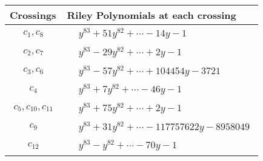 \documentclass[1p]{elsarticle_modified}
\theoremstyle{definition}
\begin{document}
\begin{tabular}{m{50pt}|m{274pt}}
Crossings & \hspace{64pt}Riley Polynomials at each crossing \\
\hline $$\begin{aligned}c_{1},c_{8}\end{aligned}$$&$\begin{aligned}
&y^{83}+51 y^{82}+\cdots-14 y-1
\end{aligned}$\\
\hline $$\begin{aligned}c_{2},c_{7}\end{aligned}$$&$\begin{aligned}
&y^{83}-29 y^{82}+\cdots+2 y-1
\end{aligned}$\\
\hline $$\begin{aligned}c_{3},c_{6}\end{aligned}$$&$\begin{aligned}
&y^{83}-57 y^{82}+\cdots+104454 y-3721
\end{aligned}$\\
\hline $$\begin{aligned}c_{4}\end{aligned}$$&$\begin{aligned}
&y^{83}+7 y^{82}+\cdots-46 y-1
\end{aligned}$\\
\hline $$\begin{aligned}c_{5},c_{10},c_{11}\end{aligned}$$&$\begin{aligned}
&y^{83}+75 y^{82}+\cdots+2 y-1
\end{aligned}$\\
\hline $$\begin{aligned}c_{9}\end{aligned}$$&$\begin{aligned}
&y^{83}+31 y^{82}+\cdots-117757622 y-8958049
\end{aligned}$\\
\hline $$\begin{aligned}c_{12}\end{aligned}$$&$\begin{aligned}
&y^{83}- y^{82}+\cdots-70 y-1
\end{aligned}$\\
\hline
\end{tabular}
\vskip 2pc
\end{document}
